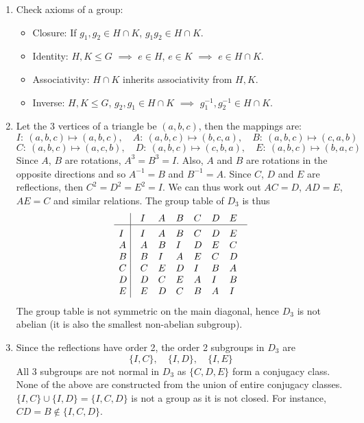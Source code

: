 \documentclass[a4paper]{article}
\begin{document}
\begin{ans}\leavevmode
\begin{enumerate}[label=(\roman*)]
\item Check axioms of a group:
\begin{itemize}
    \item Closure: If $g_1,g_2\in H\cap K$, $g_1g_2\in H\cap K$.
    \item Identity: $H,K\leq G$ $\implies$ $e\in H$, $e\in K$ $\implies$ $e\in H\cap K$.
    \item Associativity: $H\cap K$ inherits associativity from $H,K$.
    \item Inverse: $H,K\leq G$, $g_2,g_1\in H\cap K$ $\implies$ $g_1^{-1},g_2^{-1}\in H\cap K$.
\end{itemize}
\item Let the 3 vertices of a triangle be $(a,b,c)$, then the mappings are:
$$I:~(a,b,c)\mapsto(a,b,c),\quad A:~(a,b,c)\mapsto(b,c,a),\quad B:~(a,b,c)\mapsto(c,a,b)$$
$$C:~(a,b,c)\mapsto(a,c,b),\quad D:~(a,b,c)\mapsto(c,b,a),\quad E:~(a,b,c)\mapsto(b,a,c)$$
Since $A$, $B$ are rotations, $A^3=B^3=I$. Also, $A$ and $B$ are rotations in the opposite directions and so $A^{-1}=B$ and $B^{-1}=A$. Since $C$, $D$ and $E$ are reflections, then $C^2=D^2=E^2=I$. We can thus work out $AC=D$, $AD=E$, $AE=C$ and similar relations. The group table of $D_3$ is thus
$$\vbox{\tabskip0.5em\offinterlineskip
    \halign{\strut$#$\hfil\ \tabskip1em\vrule&&$#$\hfil\cr
      & I   & A  & B & C & D &E     \cr
    \noalign{\hrule}\vrule height 12pt width 0pt
    I   & I   & A  & B & C & D &E   \cr
    A   & A & B &I &D &E &C  \cr
    B & B & I & A & E &C &D \cr
    C & C &E & D& I & B &A     \cr
    D& D &C&E&A&I&B\cr
    E& E &D &C &B &A&I\cr
}}$$
The group table is not symmetric on the main diagonal, hence $D_3$ is not abelian (it is also the smallest non-abelian subgroup).
\item Since the reflections have order 2, the order 2 subgroups in $D_3$ are 
$$\{I,C\},\quad\{I,D\},\quad\{I,E\}$$
All 3 subgroups are not normal in $D_3$ as $\{C,D,E\}$ form a conjugacy class. None of the above are constructed from the union of entire conjugacy classes. $\{I,C\}\cup\{I,D\}=\{I,C,D\}$ is not a group as it is not closed. For instance, $CD=B\notin\{I,C,D\}$.
\end{enumerate}
\end{ans}
\newpage
\end{document}
